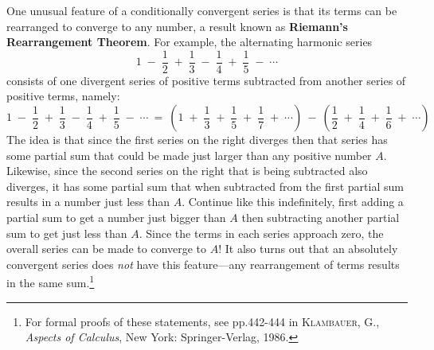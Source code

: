 \newpage
One unusual feature of a conditionally convergent series is that its terms can
be rearranged to converge to any number, a result known as \textbf{Riemann's
Rearrangement Theorem}. For example, the
alternating harmonic series
\[
1 \;-\; \frac{1}{2} \;+\; \frac{1}{3} \;-\; \frac{1}{4} \;+\;
\frac{1}{5} \;-\; \cdots
\]
consists of one divergent series of positive terms subtracted from another
series of positive terms, namely:
\[
1 \;-\; \frac{1}{2} \;+\; \frac{1}{3} \;-\; \frac{1}{4} \;+\;
\frac{1}{5} \;-\; \cdots ~=~
\left(1 \;+\; \frac{1}{3} \;+\; \frac{1}{5} \;+\; \frac{1}{7} \;+\; \cdots\right) ~-~
\left(\frac{1}{2} \;+\; \frac{1}{4} \;+\; \frac{1}{6} \;+\; \cdots\right)
\]
The idea is that since the first series on the right diverges then that series
has some partial sum that could be made just larger than any positive number
$A$. Likewise, since the second series on the right that is being subtracted
also diverges, it has some partial sum that when subtracted from the first
partial sum results in a number just less than $A$. Continue like this
indefinitely, first adding a partial sum to get a number just bigger than $A$
then subtracting another partial sum to get just less than $A$. Since the terms
in each series approach zero, the overall series can be made to converge to $A$!
It also turns out that an absolutely convergent series does
\emph{not} have this feature---any rearrangement of terms results in the same
sum.\footnote{For formal proofs of these statements, see pp.442-444 in
\textsc{Klambauer, G.}, \emph{Aspects of Calculus}, New York: Springer-Verlag,
1986.}

